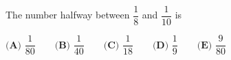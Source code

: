 The number halfway between $\dfrac18$ and $\dfrac{1}{10}$ is

$\textbf{(A) }\dfrac{1}{80}\qquad\textbf{(B) }\dfrac{1}{40}\qquad\textbf{(C) }\dfrac{1}{18}\qquad\textbf{(D) }\dfrac19\qquad\textbf{(E) }\dfrac{9}{80}$
